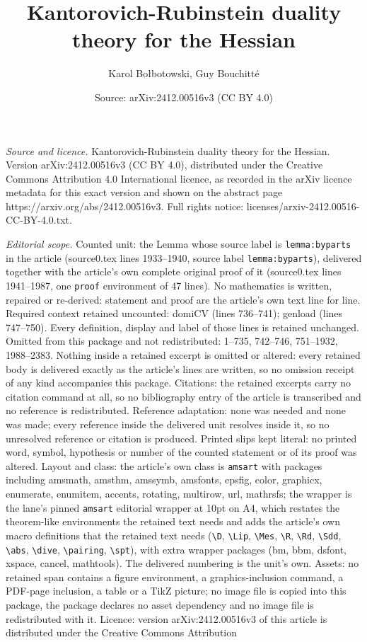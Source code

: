 \documentclass[10pt,a4paper]{amsart}
\title[Kantorovich-Rubinstein duality theory for the Hessian]{Kantorovich-Rubinstein duality theory for the Hessian}
\author{Karol Bo{\l}botowski, Guy Bouchitt\'e}
\date{Source: arXiv:2412.00516v3 (CC BY 4.0)}
\begin{document}
\maketitle

\noindent\emph{Source and licence.} Kantorovich-Rubinstein duality theory for the Hessian. Version arXiv:2412.00516v3 (CC BY 4.0), distributed under the Creative Commons Attribution 4.0 International licence, as recorded in the arXiv licence metadata for this exact version and shown on the abstract page https://arxiv.org/abs/2412.00516v3. Full rights notice: licenses/arxiv-2412.00516-CC-BY-4.0.txt.\par\smallskip

\noindent\textit{Editorial scope.} Counted unit: the Lemma whose source label is \texttt{lemma:byparts} in the article (source0.tex lines 1933--1940, source label \texttt{lemma:byparts}), delivered together with the article's own complete original proof of it (source0.tex lines 1941--1987, one \texttt{proof} environment of 47 lines). No mathematics is written, repaired or re-derived: statement and proof are the article's own text line for line. Required context retained uncounted: domiCV (lines 736--741); genload (lines 747--750). Every definition, display and label of those lines is retained unchanged. Omitted from this package and not redistributed: 1--735, 742--746, 751--1932, 1988--2383. Nothing inside a retained excerpt is omitted or altered: every retained body is delivered exactly as the article's lines are written, so no omission receipt of any kind accompanies this package. Citations: the retained excerpts carry no citation command at all, so no bibliography entry of the article is transcribed and no reference is redistributed. Reference adaptation: none was needed and none was made; every reference inside the delivered unit resolves inside it, so no unresolved reference or citation is produced. Printed slips kept literal: no printed word, symbol, hypothesis or number of the counted statement or of its proof was altered. Layout and class: the article's own class is \texttt{amsart} with packages including amsmath, amsthm, amssymb, amsfonts, epsfig, color, graphicx, enumerate, enumitem, accents, rotating, multirow, url, mathrsfs; the wrapper is the lane's pinned \texttt{amsart} editorial wrapper at 10pt on A4, which restates the theorem-like environments the retained text needs and adds the article's own macro definitions that the retained text needs (\texttt{\textbackslash D}, \texttt{\textbackslash Lip}, \texttt{\textbackslash Mes}, \texttt{\textbackslash R}, \texttt{\textbackslash Rd}, \texttt{\textbackslash Sdd}, \texttt{\textbackslash abs}, \texttt{\textbackslash dive}, \texttt{\textbackslash pairing}, \texttt{\textbackslash spt}), with extra wrapper packages (bm, bbm, dsfont, xspace, cancel, mathtools). The delivered numbering is the unit's own. Assets: no retained span contains a figure environment, a graphics-inclusion command, a PDF-page inclusion, a table or a TikZ picture; no image file is copied into this package, the package declares no asset dependency and no image file is redistributed with it. Licence: version arXiv:2412.00516v3 of this article is distributed under the Creative Commons Attribution 
\end{document}
